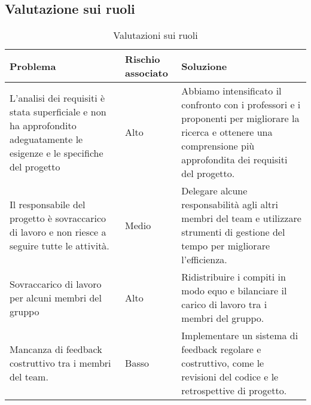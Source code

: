 \subsection{Valutazione sui ruoli}
\begin{table}[h!]
    \centering
    \begin{tabularx}{\textwidth}{|X|p{}|X|}\hline
    \rowcolor[HTML]{FFD700}
    \textbf{Problema} & \textbf{Rischio associato} & \textbf{Soluzione} \\ 
    \hline
    L’analisi dei requisiti è stata superficiale e non ha approfondito adeguatamente le
    esigenze e le specifiche del progetto & Alto & 
    Abbiamo intensificato il confronto con i professori e i proponenti per migliorare la
    ricerca e ottenere una comprensione più approfondita dei requisiti del progetto. \\ 
    \hline
    Il responsabile del progetto è sovraccarico di lavoro e non riesce a seguire tutte le attività. & Medio & 
    Delegare alcune responsabilità agli altri membri del team e utilizzare strumenti di gestione del tempo per migliorare l'efficienza. \\ 
    \hline
    Sovraccarico di lavoro per alcuni membri del gruppo & Alto & 
    Ridistribuire i compiti in modo equo e bilanciare il carico di lavoro tra i membri del gruppo. \\ 
    \hline
    Mancanza di feedback costruttivo tra i membri del team. & Basso & 
    Implementare un sistema di feedback regolare e costruttivo, come le revisioni del codice e le retrospettive di progetto. \\
    \hline
    \end{tabularx}
    \caption{Valutazioni sui ruoli}
    \label{tab:valutazioni_ruoli}
\end{table}